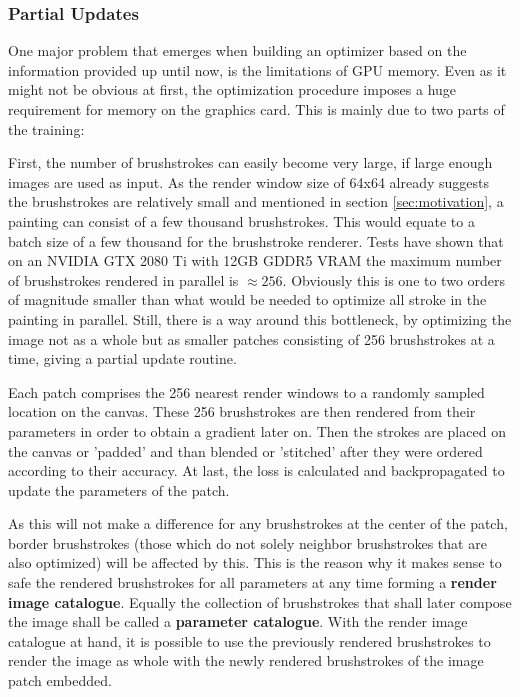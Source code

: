 \subsubsection{Partial Updates}

One major problem that emerges when building an optimizer based on the information provided up until now, is the limitations of GPU memory.
Even as it might not be obvious at first, the optimization procedure imposes a huge requirement for memory on the graphics card.
This is mainly due to two parts of the training:

First, the number of brushstrokes can easily become very large, if large enough images are used as input.
As the render window size of 64x64 already suggests the brushstrokes are relatively small and mentioned in section \ref{sec:motivation}, a painting can consist of a few thousand brushstrokes.
This would equate to a batch size of a few thousand for the brushstroke renderer.
Tests have shown that on an NVIDIA GTX 2080 Ti with 12GB GDDR5 VRAM the maximum number of brushstrokes rendered in parallel is $\approx 256$.
Obviously this is one to two orders of magnitude smaller than what would be needed to optimize all stroke in the painting in parallel.
Still, there is a way around this bottleneck, by optimizing the image not as a whole but as smaller patches consisting of 256 brushstrokes at a time, giving a partial update routine.

Each patch comprises the 256 nearest render windows to a randomly sampled location on the canvas.
These 256 brushstrokes are then rendered from their parameters in order to obtain a gradient later on.
Then the strokes are placed on the canvas or 'padded' and than blended or 'stitched' after they were ordered according to their accuracy.
At last, the loss is calculated and backpropagated to update the parameters of the patch.

As this will not make a difference for any brushstrokes at the center of the patch, border brushstrokes (those which do not solely neighbor brushstrokes that are also optimized) will be affected by this.
This is the reason why it makes sense to safe the rendered brushstrokes for all parameters at any time forming a \textbf{render image catalogue}.
Equally the collection of brushstrokes that shall later compose the image shall be called a \textbf{parameter catalogue}.
With the render image catalogue at hand, it is possible to use the previously rendered brushstrokes to render the image as whole with the newly rendered brushstrokes of the image patch embedded.

